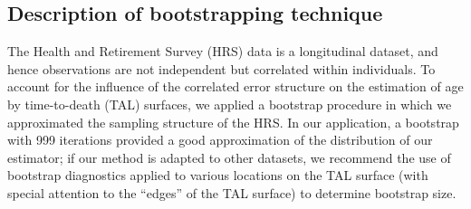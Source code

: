 \documentclass[12pt,oneside,letterpaper,doublespacing]{article}  %
\begin{document}
\begin{appendices}
% 


\section{Description of bootstrapping technique}
The Health and Retirement Survey (HRS) data is a longitudinal dataset, and hence
observations are not independent but correlated within individuals. To account
for the influence of the correlated error structure on the estimation of age
by time-to-death (TAL) surfaces, we applied a bootstrap
\citep{efron1994introduction} procedure in which we approximated the sampling structure of the HRS. In our
application, a bootstrap with 999 iterations provided a good approximation of the distribution of our estimator; if our method is adapted to other datasets, we recommend the use of bootstrap diagnostics applied to various locations on the TAL surface (with special attention to the ``edges'' of the TAL surface) to determine bootstrap size.


\end{appendices}
\end{document}

